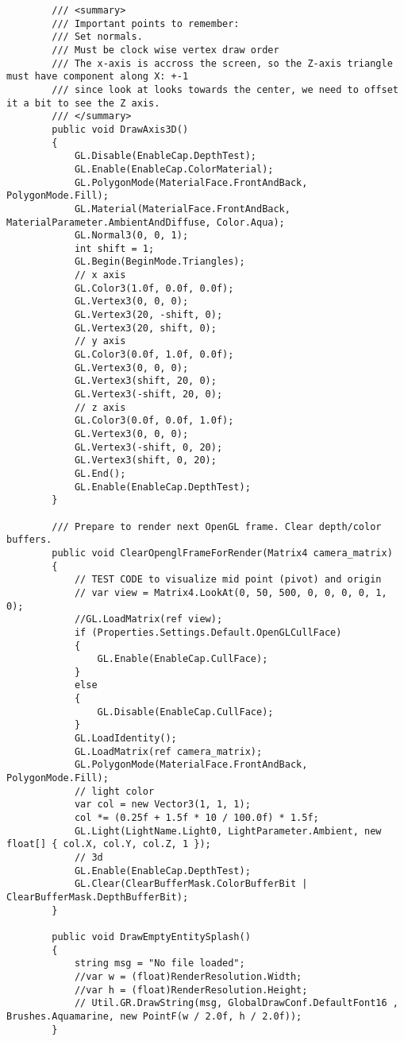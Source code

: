 \begin{scriptsize}
\begin{verbatim}
        /// <summary>
        /// Important points to remember:
        /// Set normals.
        /// Must be clock wise vertex draw order
        /// The x-axis is accross the screen, so the Z-axis triangle must have component along X: +-1
        /// since look at looks towards the center, we need to offset it a bit to see the Z axis.
        /// </summary>
        public void DrawAxis3D()
        {
            GL.Disable(EnableCap.DepthTest);
            GL.Enable(EnableCap.ColorMaterial);
            GL.PolygonMode(MaterialFace.FrontAndBack, PolygonMode.Fill);
            GL.Material(MaterialFace.FrontAndBack, MaterialParameter.AmbientAndDiffuse, Color.Aqua);
            GL.Normal3(0, 0, 1);
            int shift = 1;
            GL.Begin(BeginMode.Triangles);
            // x axis
            GL.Color3(1.0f, 0.0f, 0.0f);
            GL.Vertex3(0, 0, 0);
            GL.Vertex3(20, -shift, 0);
            GL.Vertex3(20, shift, 0);
            // y axis
            GL.Color3(0.0f, 1.0f, 0.0f);
            GL.Vertex3(0, 0, 0);
            GL.Vertex3(shift, 20, 0);
            GL.Vertex3(-shift, 20, 0);
            // z axis
            GL.Color3(0.0f, 0.0f, 1.0f);
            GL.Vertex3(0, 0, 0);
            GL.Vertex3(-shift, 0, 20);
            GL.Vertex3(shift, 0, 20);
            GL.End();
            GL.Enable(EnableCap.DepthTest);
        }

        /// Prepare to render next OpenGL frame. Clear depth/color buffers.
        public void ClearOpenglFrameForRender(Matrix4 camera_matrix)
        {
            // TEST CODE to visualize mid point (pivot) and origin
            // var view = Matrix4.LookAt(0, 50, 500, 0, 0, 0, 0, 1, 0);
            //GL.LoadMatrix(ref view);
            if (Properties.Settings.Default.OpenGLCullFace)
            {
                GL.Enable(EnableCap.CullFace);
            }
            else
            {
                GL.Disable(EnableCap.CullFace);
            }
            GL.LoadIdentity();
            GL.LoadMatrix(ref camera_matrix);
            GL.PolygonMode(MaterialFace.FrontAndBack, PolygonMode.Fill);
            // light color
            var col = new Vector3(1, 1, 1);
            col *= (0.25f + 1.5f * 10 / 100.0f) * 1.5f;
            GL.Light(LightName.Light0, LightParameter.Ambient, new float[] { col.X, col.Y, col.Z, 1 });
            // 3d
            GL.Enable(EnableCap.DepthTest);
            GL.Clear(ClearBufferMask.ColorBufferBit | ClearBufferMask.DepthBufferBit);
        }

        public void DrawEmptyEntitySplash()
        {
            string msg = "No file loaded";
            //var w = (float)RenderResolution.Width;
            //var h = (float)RenderResolution.Height;
            // Util.GR.DrawString(msg, GlobalDrawConf.DefaultFont16 , Brushes.Aquamarine, new PointF(w / 2.0f, h / 2.0f));
        }


\end{verbatim}
\end{scriptsize}
